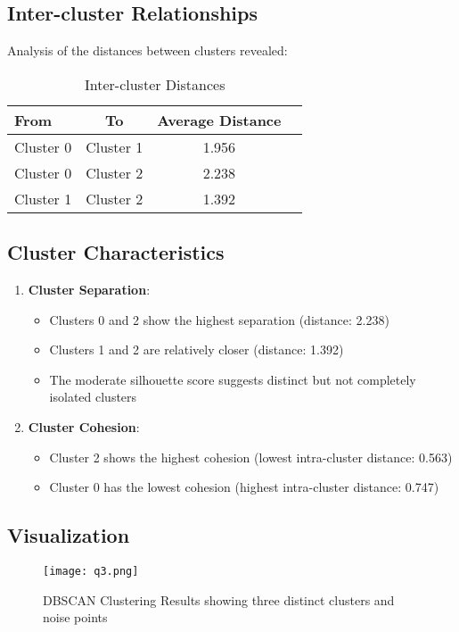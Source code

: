 \documentclass[12pt]{article}
\begin{document}
\subsection{Inter-cluster Relationships}
Analysis of the distances between clusters revealed:

\begin{table}[H]
\centering
\begin{tabular}{lccc}
\toprule
From & To & Average Distance \\
\midrule
Cluster 0 & Cluster 1 & 1.956 \\
Cluster 0 & Cluster 2 & 2.238 \\
Cluster 1 & Cluster 2 & 1.392 \\
\bottomrule
\end{tabular}
\caption{Inter-cluster Distances}
\end{table}

\subsection{Cluster Characteristics}
\begin{enumerate}
    \item \textbf{Cluster Separation}:
    \begin{itemize}
        \item Clusters 0 and 2 show the highest separation (distance: 2.238)
        \item Clusters 1 and 2 are relatively closer (distance: 1.392)
        \item The moderate silhouette score suggests distinct but not completely isolated clusters
    \end{itemize}
    
    \item \textbf{Cluster Cohesion}:
    \begin{itemize}
        \item Cluster 2 shows the highest cohesion (lowest intra-cluster distance: 0.563)
        \item Cluster 0 has the lowest cohesion (highest intra-cluster distance: 0.747)
    \end{itemize}
\end{enumerate}

\subsection{Visualization}

\begin{figure}[H]
    \centering
    \texttt{[image: q3.png]}
    \caption{DBSCAN Clustering Results showing three distinct clusters and noise points}
\end{figure}
\end{document}
